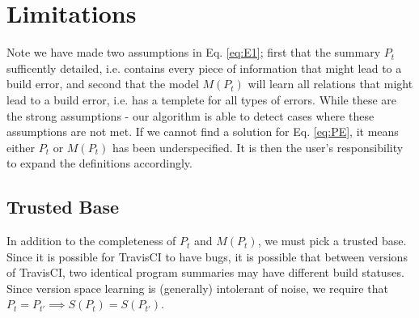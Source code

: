 \section{Limitations}

Note we have made two assumptions in Eq. \ref{eq:E1}; first that the summary $P_t$ sufficently detailed, i.e. contains every piece of information that might lead to a build error, and second that the model $M(P_t)$ will learn all relations that might lead to a build error, i.e. has a templete for all types of errors.
While these are the strong assumptions - our algorithm is able to detect cases where these assumptions are not met.
If we cannot find a solution for Eq. \ref{eq:PE}, it means either $P_t$ or $M(P_t)$ has been underspecified.
It is then the user's responsibility to expand the definitions accordingly.

\subsection{Trusted Base}
In addition to the completeness of $P_t$ and $M(P_t)$, we must pick a trusted base.
Since it is possible for TravisCI to have bugs, it is possible that between versions of TravisCI, two identical program summaries may have different build statuses.
Since version space learning is (generally) intolerant of noise, we require that
$P_t = P_{t'} \implies S(P_t) = S(P_{t'})$.
